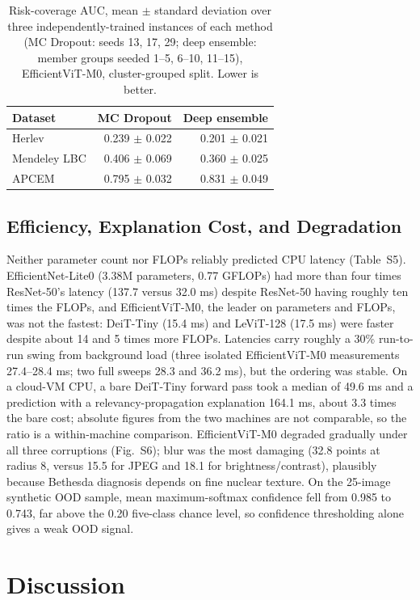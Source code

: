 \documentclass[12pt,letterpaper]{article}
\begin{document}
\begin{table}[htbp]
\centering
\caption{Risk-coverage AUC, mean $\pm$ standard deviation over three independently-trained instances of each method (MC Dropout: seeds 13, 17, 29; deep ensemble: member groups seeded 1--5, 6--10, 11--15), EfficientViT-M0, cluster-grouped split. Lower is better.}
\label{tab:uq-stability}
\small
\begin{tabular}{lrr}
\toprule
Dataset & MC Dropout & Deep ensemble \\
\midrule
Herlev & 0.239 $\pm$ 0.022 & 0.201 $\pm$ 0.021 \\
Mendeley LBC & 0.406 $\pm$ 0.069 & 0.360 $\pm$ 0.025 \\
APCEM & 0.795 $\pm$ 0.032 & 0.831 $\pm$ 0.049 \\
\bottomrule
\end{tabular}
\end{table}

\subsection{Efficiency, Explanation Cost, and Degradation}
\label{sec:eff-results}
Neither parameter count nor FLOPs reliably predicted CPU latency (Table~S5). EfficientNet-Lite0 (3.38M parameters, 0.77 GFLOPs) had more than four times ResNet-50's latency (137.7 versus 32.0 ms) despite ResNet-50 having roughly ten times the FLOPs, and EfficientViT-M0, the leader on parameters and FLOPs, was not the fastest: DeiT-Tiny (15.4 ms) and LeViT-128 (17.5 ms) were faster despite about 14 and 5 times more FLOPs. Latencies carry roughly a 30\% run-to-run swing from background load (three isolated EfficientViT-M0 measurements 27.4--28.4 ms; two full sweeps 28.3 and 36.2 ms), but the ordering was stable. On a cloud-VM CPU, a bare DeiT-Tiny forward pass took a median of 49.6 ms and a prediction with a relevancy-propagation explanation 164.1 ms, about 3.3 times the bare cost; absolute figures from the two machines are not comparable, so the ratio is a within-machine comparison. EfficientViT-M0 degraded gradually under all three corruptions (Fig.~S6); blur was the most damaging (32.8 points at radius 8, versus 15.5 for JPEG and 18.1 for brightness/contrast), plausibly because Bethesda diagnosis depends on fine nuclear texture. On the 25-image synthetic OOD sample, mean maximum-softmax confidence fell from 0.985 to 0.743, far above the 0.20 five-class chance level, so confidence thresholding alone gives a weak OOD signal.

\section{Discussion}
\label{sec:discussion}
\end{document}
